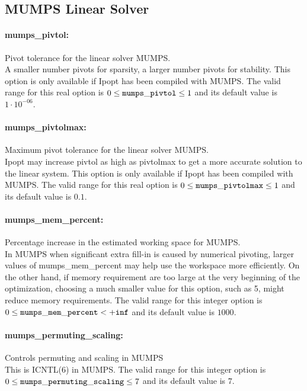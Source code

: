 \subsection{MUMPS Linear Solver}

\paragraph{mumps\_pivtol:}\label{opt:mumps_pivtol} Pivot tolerance for the linear solver MUMPS. \\
 A smaller number pivots for sparsity, a larger number pivots for stability.  This option is only available if Ipopt has been compiled with MUMPS. The valid range for this real option is 
$0 \le {\tt mumps\_pivtol } \le 1$
and its default value is $1 \cdot 10^{-06}$.


\paragraph{mumps\_pivtolmax:}\label{opt:mumps_pivtolmax} Maximum pivot tolerance for the linear solver MUMPS. \\
 Ipopt may increase pivtol as high as pivtolmax to get a more accurate solution to the linear system.  This option is only available if Ipopt has been compiled with MUMPS. The valid range for this real option is 
$0 \le {\tt mumps\_pivtolmax } \le 1$
and its default value is $0.1$.


\paragraph{mumps\_mem\_percent:}\label{opt:mumps_mem_percent} Percentage increase in the estimated working space for MUMPS. \\
 In MUMPS when significant extra fill-in is caused by numerical pivoting, larger values of mumps\_mem\_percent may help use the workspace more efficiently.  On the other hand, if memory requirement are too large at the very beginning of the optimization, choosing a much smaller value for this option, such as 5, might reduce memory requirements. The valid range for this integer option is
$0 \le {\tt mumps\_mem\_percent } <  {\tt +inf}$
and its default value is $1000$.


\paragraph{mumps\_permuting\_scaling:}\label{opt:mumps_permuting_scaling} Controls permuting and scaling in MUMPS \\
 This is ICNTL(6) in MUMPS. The valid range for this integer option is
$0 \le {\tt mumps\_permuting\_scaling } \le 7$
and its default value is $7$.


